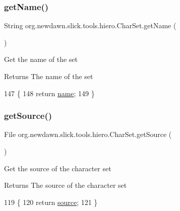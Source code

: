 \subsubsection{\texorpdfstring{get\+Name()}{getName()}}
{\footnotesize\ttfamily String org.\+newdawn.\+slick.\+tools.\+hiero.\+Char\+Set.\+get\+Name (\begin{DoxyParamCaption}{ }\end{DoxyParamCaption})\hspace{0.3cm}{\ttfamily [inline]}}

Get the name of the set

\begin{DoxyReturn}{Returns}
The name of the set 
\end{DoxyReturn}

\begin{DoxyCode}
147                             \{
148         \textcolor{keywordflow}{return} \mbox{\hyperlink{classorg_1_1newdawn_1_1slick_1_1tools_1_1hiero_1_1_char_set_aff26a369817bc815327582f0b7ac215e}{name}};
149     \}
\end{DoxyCode}
\mbox{\label{classorg_1_1newdawn_1_1slick_1_1tools_1_1hiero_1_1_char_set_a7e09cb1cd14964453372d8995cfae807}} 
\subsubsection{\texorpdfstring{get\+Source()}{getSource()}}
{\footnotesize\ttfamily File org.\+newdawn.\+slick.\+tools.\+hiero.\+Char\+Set.\+get\+Source (\begin{DoxyParamCaption}{ }\end{DoxyParamCaption})\hspace{0.3cm}{\ttfamily [inline]}}

Get the source of the character set

\begin{DoxyReturn}{Returns}
The source of the character set 
\end{DoxyReturn}

\begin{DoxyCode}
119                             \{
120         \textcolor{keywordflow}{return} \mbox{\hyperlink{classorg_1_1newdawn_1_1slick_1_1tools_1_1hiero_1_1_char_set_a82b51d3f0bc57605405fde4608c44520}{source}};
121     \}
\end{DoxyCode}
\mbox{\label{classorg_1_1newdawn_1_1slick_1_1tools_1_1hiero_1_1_char_set_ab272036029afe5b828101e7ec0171e51}} 
